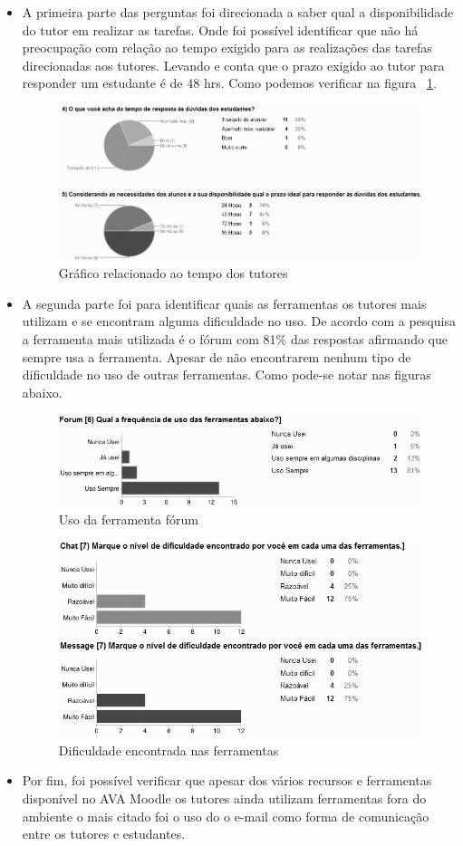 \documentclass[12pt]{article}
\begin{document}
\begin{itemize}
	\item A primeira parte das perguntas foi direcionada a saber qual a disponibilidade do tutor em realizar as tarefas.  Onde foi possível identificar que não há     preocupação com relação ao tempo exigido para as realizações das tarefas direcionadas aos tutores. Levando e conta que o prazo exigido ao tutor para responder um estudante é de 48 hrs. Como podemos verificar na figura ~\ref{fig:ResultTempo}.
	\begin{figure}[ht]
\centering
\includegraphics[width=.5\textwidth]{ResultTempo.jpg}
\caption{Gráfico relacionado ao tempo dos tutores}
\label{fig:ResultTempo}
\end{figure}
\item A segunda parte foi para identificar quais as ferramentas os tutores mais utilizam e se encontram alguma dificuldade no uso. De acordo com a pesquisa a ferramenta mais utilizada é o fórum com 81$\%$ das respostas afirmando que sempre usa a ferramenta. Apesar de não encontrarem nenhum tipo de dificuldade no uso de outras ferramentas. Como pode-se notar nas figuras abaixo.
	\begin{figure}[ht]
\centering
\includegraphics[width=.5\textwidth]{ResultForum.jpg}
\caption{Uso da ferramenta fórum}
\label{fig:ResultForum}
\end{figure}
	\begin{figure}[ht]
\centering
\includegraphics[width=.5\textwidth]{ResultDificuldade.jpg}
\caption{Dificuldade encontrada nas ferramentas}
\label{fig:Dificuldade}
\end{figure}
\item Por fim, foi possível verificar que apesar dos vários recursos e ferramentas disponível no AVA Moodle os tutores ainda utilizam ferramentas fora do ambiente o mais citado foi o uso do o e-mail como forma de comunicação entre os tutores e estudantes. 
\end{itemize}
\end{document}
